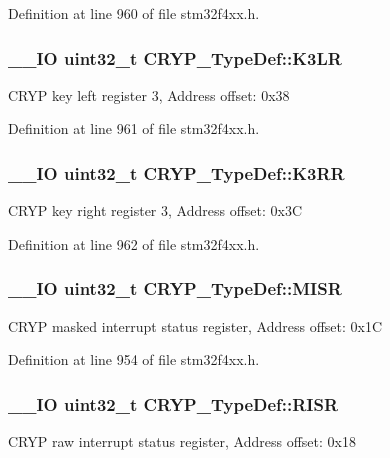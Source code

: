 Definition at line 960 of file stm32f4xx.\-h.

\hypertarget{struct_c_r_y_p___type_def_a39e099c27b2be81a03c09810f390454b}{
\subsubsection[{K3\-L\-R}]{\setlength{\rightskip}{0pt plus 5cm}\-\_\-\-\_\-\-I\-O {\bf uint32\-\_\-t} C\-R\-Y\-P\-\_\-\-Type\-Def\-::\-K3\-L\-R}}\label{struct_c_r_y_p___type_def_a39e099c27b2be81a03c09810f390454b}
C\-R\-Y\-P key left register 3, Address offset\-: 0x38 

Definition at line 961 of file stm32f4xx.\-h.

\hypertarget{struct_c_r_y_p___type_def_a1c3230419aed39ab61263b87547cbc3e}{
\subsubsection[{K3\-R\-R}]{\setlength{\rightskip}{0pt plus 5cm}\-\_\-\-\_\-\-I\-O {\bf uint32\-\_\-t} C\-R\-Y\-P\-\_\-\-Type\-Def\-::\-K3\-R\-R}}\label{struct_c_r_y_p___type_def_a1c3230419aed39ab61263b87547cbc3e}
C\-R\-Y\-P key right register 3, Address offset\-: 0x3\-C 

Definition at line 962 of file stm32f4xx.\-h.

\hypertarget{struct_c_r_y_p___type_def_aa807ff93c7ce98e9d13cbc52d245770f}{
\subsubsection[{M\-I\-S\-R}]{\setlength{\rightskip}{0pt plus 5cm}\-\_\-\-\_\-\-I\-O {\bf uint32\-\_\-t} C\-R\-Y\-P\-\_\-\-Type\-Def\-::\-M\-I\-S\-R}}\label{struct_c_r_y_p___type_def_aa807ff93c7ce98e9d13cbc52d245770f}
C\-R\-Y\-P masked interrupt status register, Address offset\-: 0x1\-C 

Definition at line 954 of file stm32f4xx.\-h.

\hypertarget{struct_c_r_y_p___type_def_a04be1b2f14a37aed1deff4d57e6261dd}{
\subsubsection[{R\-I\-S\-R}]{\setlength{\rightskip}{0pt plus 5cm}\-\_\-\-\_\-\-I\-O {\bf uint32\-\_\-t} C\-R\-Y\-P\-\_\-\-Type\-Def\-::\-R\-I\-S\-R}}\label{struct_c_r_y_p___type_def_a04be1b2f14a37aed1deff4d57e6261dd}
C\-R\-Y\-P raw interrupt status register, Address offset\-: 0x18 

